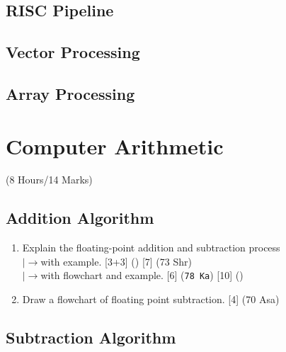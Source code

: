 \documentclass[12pt]{article}
\newcommand{\lb}{\\$\left|\rightarrow\right.$}
\begin{document}
	\subsection{RISC Pipeline}
	\subsection{Vector Processing}
	\subsection{Array Processing}

	\pagebreak
\section{Computer Arithmetic}
	\begin{center}(8 Hours/14 Marks)\end{center}
	\subsection{Addition Algorithm}
	\begin{enumerate}[noitemsep, topsep=0pt]
		\item Explain the floating-point addition and subtraction process
		\lb with example. \hfill [3+3] () [7] (73 Shr)
		\lb with flowchart and example. \hfill [6] (\texttt{78 Ka}) [10] ()
		
		\item Draw a flowchart of floating point subtraction. \hfill [4] (70 Asa)
	\end{enumerate}
	\subsection{Subtraction Algorithm}
\end{document}
